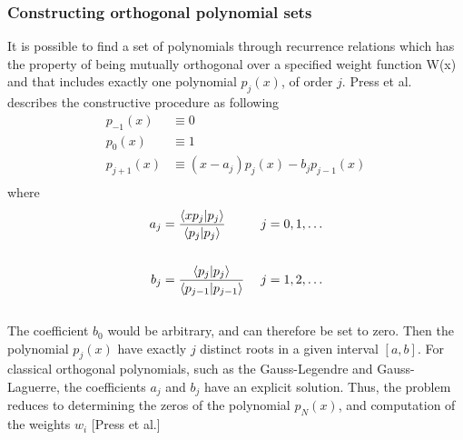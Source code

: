 \documentclass[%
reprint,
amsmath,amssymb,
aps,
]{revtex4-1}
\begin{document}
\subsubsection{Constructing orthogonal polynomial sets} \noindent 
It is possible to find a set of polynomials through recurrence relations which has the property of being mutually orthogonal over a specified weight function W(x) and that includes exactly one polynomial $p_j(x)$, of order $j$. Press et al. describes the constructive procedure as following\vspace{0.5mm} \\
\begin{align*}
	p_{-1}(x) &\equiv 0\\
	p_{0}(x) &\equiv 1\\
	p_{j+1}(x) &\equiv (x-a_j)p_j(x)-b_jp_{j-1}(x)\\
\end{align*} 
where  \\
\begin{align*}
	a_j &= \dfrac{\braket{xp_j}{p_j}}{\braket{p_j}{p_j}} &\hspace{1mm} j = 0,1, \dots \\ &&\\
	b_j &=\dfrac{\braket{p_j}{p_j}}{\braket{p_{j-1}}{p_{j-1}}} &\hspace{1mm} j = 1,2, \dots
\end{align*} \vspace{0.5mm} \\
The coefficient $b_0$ would be arbitrary, and can therefore be set to zero. Then the polynomial $p_j(x)$ have exactly $j$ distinct roots in a given interval $[a,b]$. For classical orthogonal polynomials, such as the Gauss-Legendre and Gauss-Laguerre, the coefficients $a_j$ and $b_j$ have an explicit solution. Thus, the problem reduces to determining the zeros of the polynomial $p_N(x)$, and computation of the weights $w_i$ [Press et al.]\\
\end{document}
